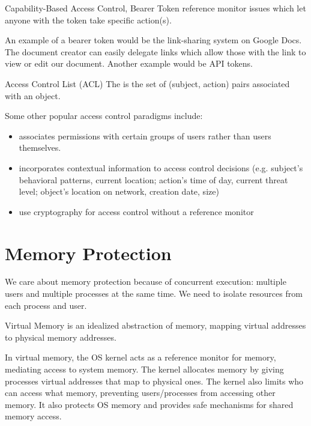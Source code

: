 \begin{dfnbox}{Capability-Based Access Control, Bearer Token}{}
     reference monitor issues  which let anyone with the token take specific action(s).
\end{dfnbox}

An example of a bearer token would be the link-sharing system on Google Docs. The document creator can easily delegate links which allow those with the link to view or edit our document. Another example would be API tokens.

\begin{dfnbox}{Access Control List (ACL)}{}
    The  is the set of (subject, action) pairs associated with an object.
\end{dfnbox}

Some other popular access control paradigms include:
\begin{itemize}
    \item {} associates permissions with certain groups of users rather than users themselves.
    \item {} incorporates contextual information to access control decisions (e.g. subject's behavioral patterns, current location; action's time of day, current threat level; object's location on network, creation date, size)
    \item {} use cryptography for access control without a reference monitor
\end{itemize}

\section{Memory Protection}
We care about memory protection because of concurrent execution: multiple users and multiple processes at the same time. We need to isolate resources from each process and user.

\begin{dfnbox}{Virtual Memory}{}
     is an idealized abstraction of memory, mapping virtual addresses to physical memory addresses.
\end{dfnbox}

In virtual memory, the OS kernel acts as a reference monitor for memory, mediating access to system memory. The kernel allocates memory by giving processes virtual addresses that map to physical ones. The kernel also limits who can access what memory, preventing users/processes from accessing other memory. It also protects OS memory and provides safe mechanisms for shared memory access.


